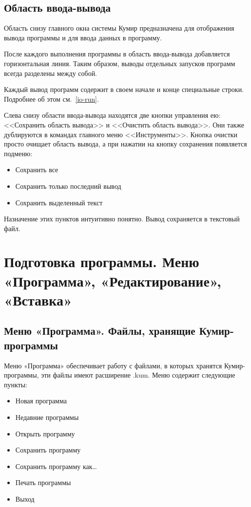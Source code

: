\documentclass[12pt,a4paper]{article}
\begin{document}
\subsection{Область ввода-вывода}
\label{io}

Область снизу главного окна системы Кумир предназначена для отображения вывода программы и для ввода данных в программу.

После каждого выполнения программы в область ввода-вывода добавляется горизонтальная линия. Таким образом, выводы отдельных запусков программ всегда разделены между собой.

Каждый вывод программ содержит в своем начале и конце специальные строки. Подробнее об этом см.~\ref{io-run}.

Слева снизу области ввода-вывода находятся две кнопки управления ею: <<Сохранить область вывода>> и <<Очистить область вывода>>. Они также дублируются в командах главного меню <<Инструменты>>. Кнопка очистки просто очищает область вывода, а при нажатии на кнопку сохранения появляется подменю:
\begin{itemize}
\item Сохранить все
\item Сохранить только последний вывод
\item Сохранить выделенный текст
\end{itemize}
Назначение этих пунктов интуитивно понятно. Вывод сохраняется в текстовый файл.

\section{Подготовка программы. Меню «Программа», «Редактирование», «Вставка»}
\label{preparing}

\subsection{Меню «Программа». Файлы, хранящие Кумир-программы}
\label{menufile}

Меню «Программа» обеспечивает работу с файлами, в которых хранятся Кумир-прог\-рам\-мы, эти файлы имеют расширение .kum. Меню содержит следующие пункты:
\begin{itemize}
\item Новая программа
\item Недавние программы
\item Открыть программу
\item Сохранить программу
\item Сохранить программу как\dots
\item Печать программы
\item Выход
\end{itemize}
\end{document}
